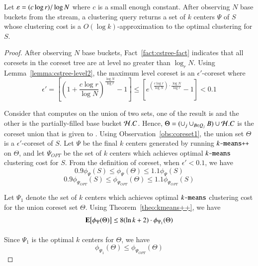\begin{lemma}
\label{lemma:cstree-accuracy}
Let $\varepsilon=(c \log r) /\log N$ where $c$ is a small enough constant. 
After observing $N$ base buckets from the stream, a clustering query \clusterquery{} returns a set of $k$ centers $\Psi$ of $S$ whose clustering
cost is a $O(\log k)$-approximation to the optimal clustering for $S$.
\end{lemma}
\begin{proof}
	After observing $N$ base buckets, Fact~\ref{fact:cstree-fact} indicates
	that all coresets in the coreset tree are at level no greater than $\log_r N$. Using Lemma~\ref{lemma:cstree-level2}, the maximum level coreset is an $\epsilon'$-coreset where
	\[
	\epsilon' = 
	\left[ \left(1 + \frac{c \log r}{\log N}\right)^{\frac{\log N}{\log r}} - 1 \right] 
	\le 
	\left[ e^{\left(\frac{{c}\log r}{\log N}\right) \cdot \frac{\log N}{\log r}} - 1 \right] 
	< 0.1
	\]
	
	Consider that \clusterquery computes \kmpp on the union of two sets, 
	one of the result is \ctcoreset and the other is the partially-filled base bucket
	$\mathcal{H}.C$.  Hence, $\Theta = (\cup_{j} \cup_{B \in Q_j} B) \cup \mathcal{H}.C$
	is the coreset union that is given to \kmpp.  
	Using Observation~\ref{obs:coreset1}, the union set $\Theta$ is a $\epsilon'$-coreset of $S$. 
	Let $\Psi$ be the final $k$ centers generated by running $\texttt{$k$-means++}$ on $\Theta$, 
	and let $\Psi_{OPT}$ be the set of $k$ centers which achieves optimal $\texttt{$k$-means}$ clustering
	cost for $S$. From the definition of coreset, when $\epsilon'<0.1$, we have
	\begin{equation}
	\label{eq:accuracy eq1}
	0.9\phi_{\Psi}(S)  \le \phi_{\Psi}(\Theta) \le 1.1\phi_{\Psi}(S)
	\end{equation}
	\begin{equation}
	\label{eq:accuracy eq2}
	0.9\phi_{\Psi_{OPT}}(S)  \le \phi_{\Psi_{OPT}}(\Theta) \le 1.1\phi_{\Psi_{OPT}}(S)
	\end{equation}
	
	Let $\Psi_1$ denote the set of $k$ centers which achieves optimal $\texttt{$k$-means}$
	clustering cost for the union coreset set $\Theta$.  
	Using Theorem~\ref{theo:kmeans++}, we have
	\begin{equation}
	\label{eq:accuracy eq3}
	\expct{ \phi_{\Psi}(\Theta)} \le 8(\ln k+2) \cdot \phi_{\Psi_1}(\Theta)
	\end{equation}
	
	Since $\Psi_1$ is the optimal $k$ centers for $\Theta$, we have 
	\begin{equation}
	\label{eq:accuracy eq4}
	\phi_{\Psi_1}(\Theta) \le \phi_{\Psi_{OPT}}(\Theta)
	\end{equation}
	

\end{proof}
